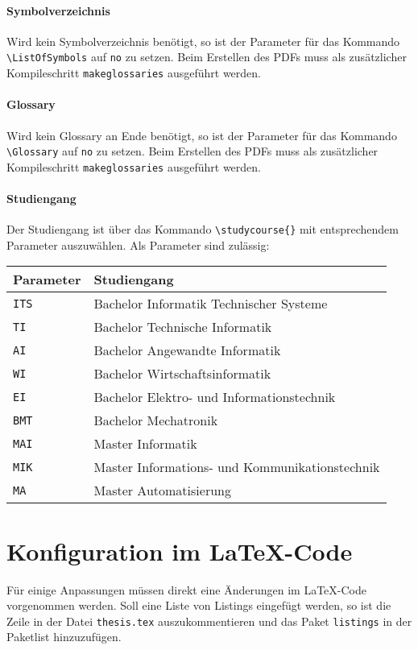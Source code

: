 \paragraph{Symbolverzeichnis} Wird kein Symbolverzeichnis benötigt, so ist der Parameter für das Kommando \texttt{\textbackslash ListOfSymbols} auf \texttt{no} zu setzen. Beim Erstellen des PDFs muss als zusätzlicher Kompileschritt \texttt{makeglossaries} ausgeführt werden.

\paragraph{Glossary} Wird kein Glossary an Ende benötigt, so ist der Parameter für das Kommando \texttt{\textbackslash Glossary} auf \texttt{no} zu setzen. Beim Erstellen des PDFs muss als zusätzlicher Kompileschritt \texttt{makeglossaries} ausgeführt werden.

\paragraph{Studiengang} Der Studiengang ist über das Kommando
\texttt{\textbackslash studycourse\{\}} mit entsprechendem Parameter
auszuwählen. Als Parameter sind zulässig:

\begin{center}
  \begin {tabular}{ll}
    Parameter & Studiengang \\
    \hline
    \texttt{ITS} & Bachelor Informatik Technischer Systeme \\
    \texttt{TI} & Bachelor Technische Informatik \\
    \texttt{AI} & Bachelor Angewandte Informatik \\
    \texttt{WI} & Bachelor Wirtschaftsinformatik \\
    \texttt{EI} & Bachelor Elektro- und Informationstechnik \\
    \texttt{BMT} & Bachelor Mechatronik \\
    \texttt{MAI} & Master Informatik \\
    \texttt{MIK} & Master Informations- und Kommunikationstechnik \\
    \texttt{MA} & Master Automatisierung \\
  \end{tabular}
\end{center}

\section{Konfiguration im \LaTeX -Code}\label{sec:codechanges}
Für einige Anpassungen müssen direkt eine Änderungen im \LaTeX -Code vorgenommen werden. Soll eine Liste von Listings eingefügt werden, so ist die Zeile in der Datei \texttt{thesis.tex} auszukommentieren und das Paket \texttt{listings} in der Paketlist hinzuzufügen.
